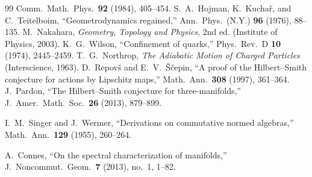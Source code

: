 \documentclass[12pt,openany]{book}
\numberwithin{equation}{section}
\theoremstyle{plain}
\theoremstyle{definition}
\theoremstyle{remark}
\begin{document}
\begin{thebibliography}{99}
	Comm.\ Math.\ Phys.\ \textbf{92} (1984), 405--454.
	S.~A.~Hojman, K.~Kucha\v{r}, and C.~Teitelboim,
	``Geometrodynamics regained,''
	Ann.\ Phys.\ (N.Y.) \textbf{96} (1976), 88--135.
	M.~Nakahara,
	\emph{Geometry, Topology and Physics}, 2nd ed.
	(Institute of Physics, 2003).
	K.~G.~Wilson,
	``Confinement of quarks,''
	Phys.\ Rev.\ D \textbf{10} (1974), 2445--2459.
	T.~G.~Northrop,
	\emph{The Adiabatic Motion of Charged Particles}
	(Interscience, 1963).
	D.~Repov\v{s} and E.~V.~\v{S}\v{c}epin,
	``A proof of the Hilbert--Smith conjecture for actions by Lipschitz
	maps,''
	Math.\ Ann.\ \textbf{308} (1997), 361--364.
	J.~Pardon,
	``The Hilbert--Smith conjecture for three-manifolds,''
	J.\ Amer.\ Math.\ Soc.\ \textbf{26} (2013), 879--899.

	I.~M.~Singer and J.~Wermer,
	``Derivations on commutative normed algebras,''
	Math.\ Ann.\ \textbf{129} (1955), 260--264.

	A.~Connes,
	``On the spectral characterization of manifolds,''
	J.\ Noncommut.\ Geom.\ \textbf{7} (2013), no.~1, 1--82.
\end{thebibliography}
\let\doi\relax
\let\arxivref\relax

\end{document}
